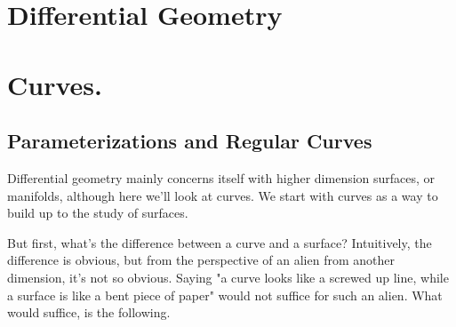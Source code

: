 \documentclass[12pt,letterpaper,boxed]{maths_v5}
\theoremstyle{definition}
\begin{document}
\section*{Differential Geometry}
\tableofcontents

\setcounter{section}{0}

\newpage
\section{Curves.}

\subsection{Parameterizations and Regular Curves}
Differential geometry mainly concerns itself with higher dimension surfaces, or manifolds, 
although here we'll look at curves. We start with curves as a way to build 
up to the study of surfaces. 

But first, what's the difference between a 
curve and a surface? Intuitively, the difference is obvious, but 
from the perspective of an alien from another dimension, it's not so obvious. 
Saying "a curve looks like a screwed up line, while a surface is like 
a bent piece of paper" would not suffice for such an alien. 
What would suffice, is the following. 
\end{document}

